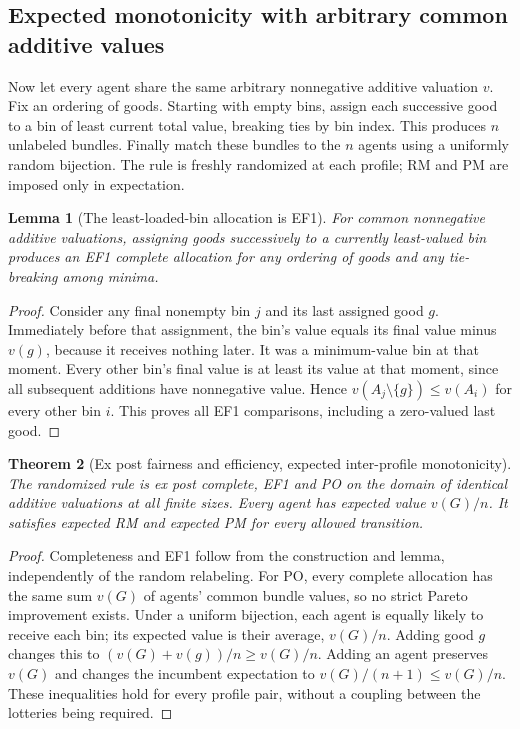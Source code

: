\documentclass[11pt,a4paper]{article}
\newtheorem{theorem}{Theorem}
\newtheorem{lemma}[theorem]{Lemma}
\begin{document}
\subsection*{Expected monotonicity with arbitrary common additive values}
Now let every agent share the same arbitrary nonnegative additive valuation $v$. Fix an ordering of goods. Starting with empty bins, assign each successive good to a bin of least current total value, breaking ties by bin index. This produces $n$ unlabeled bundles. Finally match these bundles to the $n$ agents using a uniformly random bijection. The rule is freshly randomized at each profile; RM and PM are imposed only in expectation.

\begin{lemma}[The least-loaded-bin allocation is EF1]
For common nonnegative additive valuations, assigning goods successively to a currently least-valued bin produces an EF1 complete allocation for any ordering of goods and any tie-breaking among minima.
\end{lemma}
\begin{proof}
Consider any final nonempty bin $j$ and its last assigned good $g$. Immediately before that assignment, the bin's value equals its final value minus $v(g)$, because it receives nothing later. It was a minimum-value bin at that moment. Every other bin's final value is at least its value at that moment, since all subsequent additions have nonnegative value. Hence $v(A_j\setminus\{g\})\leq v(A_i)$ for every other bin $i$. This proves all EF1 comparisons, including a zero-valued last good.
\end{proof}

\begin{theorem}[Ex post fairness and efficiency, expected inter-profile monotonicity]
The randomized rule is ex post complete, EF1 and PO on the domain of identical additive valuations at all finite sizes. Every agent has expected value $v(G)/n$. It satisfies expected RM and expected PM for every allowed transition.
\end{theorem}
\begin{proof}
Completeness and EF1 follow from the construction and lemma, independently of the random relabeling. For PO, every complete allocation has the same sum $v(G)$ of agents' common bundle values, so no strict Pareto improvement exists.
Under a uniform bijection, each agent is equally likely to receive each bin; its expected value is their average, $v(G)/n$. Adding good $g$ changes this to $(v(G)+v(g))/n\geq v(G)/n$. Adding an agent preserves $v(G)$ and changes the incumbent expectation to $v(G)/(n+1)\leq v(G)/n$. These inequalities hold for every profile pair, without a coupling between the lotteries being required.
\end{proof}
\end{document}
